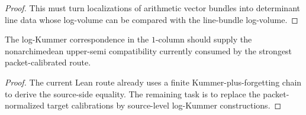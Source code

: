 \begin{proof}
  This must turn localizations of arithmetic vector bundles into determinant
  line data whose log-volume can be compared with the \qPilot{} line-bundle
  log-volume.
\end{proof}

\begin{theorem}
  \label{thm:construct-log-kummer-upper-semi}
  \notready
  The log-Kummer correspondence in the \(1\)-column should supply the
  nonarchimedean upper-semi compatibility currently consumed by the strongest
  packet-calibrated route.
\end{theorem}

\begin{proof}
  The current Lean route already uses a finite Kummer-plus-forgetting chain to
  derive the source-side equality.  The remaining task is to replace the
  packet-normalized target calibrations by source-level log-Kummer
  constructions.


\end{proof}

